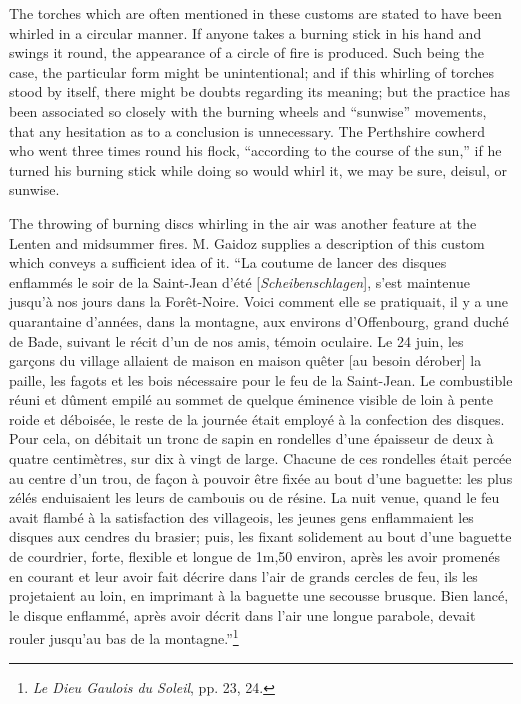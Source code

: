\documentclass[a4paper, 11pt, oneside, polutonikogreek, english]{article}
\begin{document}
The torches which are often mentioned in these customs are stated to have been whirled in a circular manner. If anyone takes a burning stick in his hand and swings it round, the appearance of a circle of fire is produced. Such being the case, the particular form might be unintentional; and if this whirling of torches stood by itself, there might be doubts regarding its meaning; but the practice has been associated so closely with the burning wheels and ``sunwise'' movements, that any hesitation as to a conclusion is unnecessary. The Perthshire cowherd who went three times round his flock, ``according to the course of the sun,'' if he turned his burning stick while doing so would whirl it, we may be sure, deisul, or sunwise.

The throwing of burning discs whirling in the air was another feature at the Lenten and midsummer fires. M. Gaidoz supplies a description of this custom which conveys a sufficient idea of it. ``La coutume de lancer des disques enflammés le soir de la Saint-Jean d'été [\emph{Scheibenschlagen}], s'est maintenue jusqu'à nos jours dans la Forêt-Noire. Voici comment elle se pratiquait, il y a une quarantaine d'années, dans la montagne, aux environs d'Offenbourg, grand duché de Bade, suivant le récit d'un de nos amis, témoin oculaire. Le 24 juin, les garçons du village allaient de maison en maison quêter [au besoin dérober] la paille, les fagots et les bois nécessaire pour le feu de la Saint-Jean. Le combustible réuni et dûment empilé au sommet de quelque éminence visible de loin à pente roide et déboisée, le reste de la journée était employé à la confection des disques. Pour cela, on débitait un tronc de sapin en rondelles d'une épaisseur de deux à quatre centimètres, sur dix à vingt de large. Chacune de ces rondelles était percée au centre d'un trou, de façon à pouvoir être fixée au bout d'une baguette: les plus zélés enduisaient les leurs de cambouis ou de résine. La nuit venue, quand le feu avait flambé à la satisfaction des villageois, les jeunes gens enflammaient les disques aux cendres du brasier; puis, les fixant solidement au bout d'une baguette de courdrier, forte, flexible et longue de 1m,50 environ, après les avoir promenés en courant et leur avoir fait décrire dans l'air de grands cercles de feu, ils les projetaient au loin, en imprimant à la baguette une secousse brusque. Bien lancé, le disque enflammé, après avoir décrit dans l'air une longue parabole, devait rouler jusqu'au bas de la montagne.''\footnote{\emph{Le Dieu Gaulois du Soleil}, pp. 23, 24.}
\end{document}
